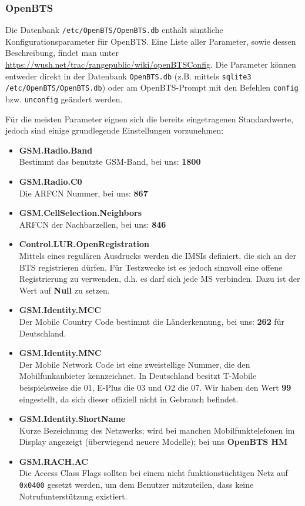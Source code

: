 \subsubsection{OpenBTS}
Die Datenbank \verb|/etc/OpenBTS/OpenBTS.db| enthält sämtliche Konfigurationsparameter für OpenBTS. Eine Liste aller Parameter, sowie dessen Beschreibung, findet man unter \url{https://wush.net/trac/rangepublic/wiki/openBTSConfig}.
Die Parameter können entweder direkt in der Datenbank \verb|OpenBTS.db| (z.B. mittels \verb|sqlite3 /etc/OpenBTS/OpenBTS.db|) oder am OpenBTS-Prompt mit den Befehlen \verb|config| bzw. \verb|unconfig| geändert werden.

Für die meisten Parameter eignen sich die bereits eingetragenen Standardwerte, jedoch sind einige grundlegende Einstellungen vorzunehmen:

\begin{itemize}
  \item \textbf{GSM.Radio.Band}\\
  Bestimmt das benutzte GSM-Band, bei uns: \textbf{1800}
  \item \textbf{GSM.Radio.C0}\\
  Die ARFCN Nummer, bei uns: \textbf{867}
  \item \textbf{GSM.CellSelection.Neighbors}\\
  ARFCN der Nachbarzellen, bei uns: \textbf{846}
  \item \textbf{Control.LUR.OpenRegistration}\\
  Mittels eines regulären Ausdrucks werden die IMSIs definiert, die sich an der BTS registrieren dürfen. Für Testzwecke ist es jedoch sinnvoll eine offene Registrierung zu verwenden, d.h. es darf sich jede MS verbinden. Dazu ist der Wert auf \textbf{Null} zu setzen.
  \item \textbf{GSM.Identity.MCC}\\
  Der Mobile Country Code bestimmt die Länderkennung, bei uns: \textbf{262} für Deutschland.
  \item \textbf{GSM.Identity.MNC}\\
  Der Mobile Network Code ist eine zweistellige Nummer, die den Mobilfunkanbieter kennzeichnet. In Deutschland besitzt T-Mobile beispielsweise die 01, E-Plus die 03 und O2 die 07. Wir haben den Wert \textbf{99} eingestellt, da sich dieser offiziell nicht in Gebrauch befindet.
  \item \textbf{GSM.Identity.ShortName}\\
  Kurze Bezeichnung des Netzwerks; wird bei manchen Mobilfunktelefonen im Display angezeigt (überwiegend neuere Modelle); bei uns \textbf{OpenBTS HM}
  \item \textbf{GSM.RACH.AC}\\
  Die Access Class Flags sollten bei einem nicht funktionstüchtigen Netz auf \verb|0x0400| gesetzt werden, um dem Benutzer mitzuteilen, dass keine Notrufunterstützung existiert.    
\end{itemize} 

